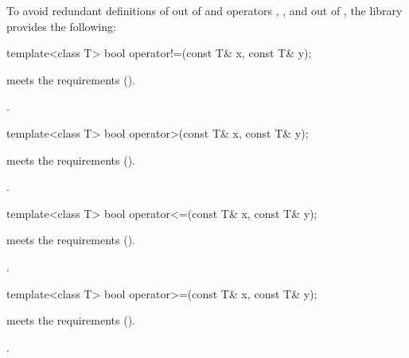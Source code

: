 \pnum
To avoid redundant definitions of  out of 
and operators \tcode{>}, \tcode{<=}, and \tcode{>=} out of ,
the library provides the following:

%
\begin{itemdecl}
template<class T> bool operator!=(const T& x, const T& y);
\end{itemdecl}

\begin{itemdescr}
\pnum
\expects
{} meets the  requirements ().

\pnum
\returns
{}.
\end{itemdescr}

%
\begin{itemdecl}
template<class T> bool operator>(const T& x, const T& y);
\end{itemdecl}

\begin{itemdescr}
\pnum
\expects
{} meets the  requirements ().

\pnum
\returns
{}.
\end{itemdescr}

%
\begin{itemdecl}
template<class T> bool operator<=(const T& x, const T& y);
\end{itemdecl}

\begin{itemdescr}
\pnum
\expects
{} meets the  requirements ().

\pnum
\returns
{}.
\end{itemdescr}

%
\begin{itemdecl}
template<class T> bool operator>=(const T& x, const T& y);
\end{itemdecl}

\begin{itemdescr}
\pnum
\expects
{} meets the  requirements ().

\pnum
\returns
{}.
\end{itemdescr}

